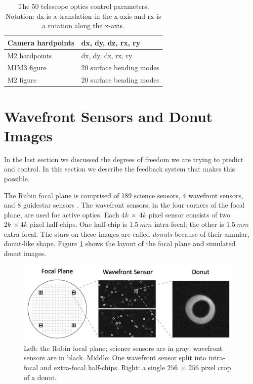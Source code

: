 \begin{table}[hbt!]
\caption[The 50 Telescope Degrees of Freedom]{\label{tab:dof}The 50 telescope optics control parameters. Notation: dx is a translation in the x-axis and rx is a rotation along the x-axis.} 
\begin{center}
\begin{tabular}{|l|l|}
\hline
\rule[-1ex]{0pt}{3.5ex} Camera hardpoints & dx, dy, dz, rx, ry \\
\hline
\rule[-1ex]{0pt}{3.5ex} M2 hardpoints & dx, dy, dz, rx, ry \\
\hline
\rule[-1ex]{0pt}{3.5ex} M1M3 figure & 20 surface bending modes \\
\hline
\rule[-1ex]{0pt}{3.5ex} M2 figure & 20 surface bending modes \\
\hline
\end{tabular}
\end{center}
\end{table} 

\section{Wavefront Sensors and Donut Images}

In the last section we discussed the degrees of freedom we are trying to predict and control. In this section we describe the feedback system that makes this possible. 

The Rubin focal plane is comprised of 189 science sensors, 4 wavefront sensors, and 8 guidestar sensors \cite{10.1117/12.926710}. The wavefront sensors, in the four corners of the focal plane, are used for active optics. Each $4k\ \times\ 4k$ pixel sensor consists of two $2k\ \times 4k$ pixel half-chips. One half-chip is $1.5\ mm$ intra-focal; the other is $1.5\ mm$ extra-focal. The stars on these images are called \textit{donuts} because of their annular, donut-like shape. Figure \ref{fig:focalplane} shows the layout of the focal plane and simulated donut images.

\begin{figure}[hbt!]
\centering
\includegraphics[width=14cm, keepaspectratio]{figs/rubin_telescope_and_aos/wavefrontsensorbreakdown.png}
\caption[From Focal Plane, To Wavefront Sensor, To Donut Image]{Left: the Rubin focal plane; science sensors are in gray; wavefront sensors are in black. Middle: One wavefront sensor split into intra-focal and extra-focal half-chips. Right: a single $256\ \times\ 256$ pixel crop of a donut.}
\label{fig:focalplane}
\end{figure}

